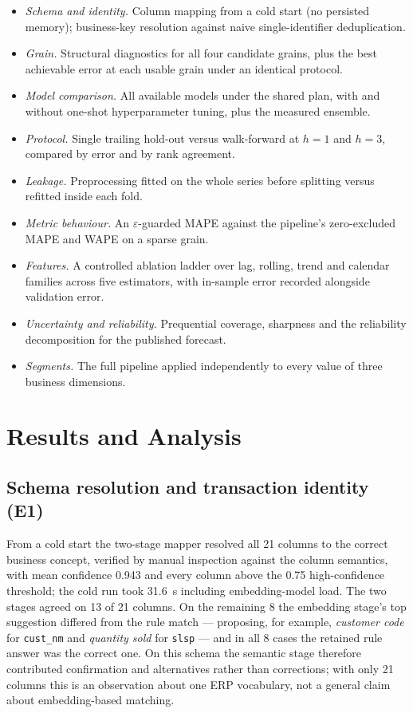\documentclass[conference]{IEEEtran}
\begin{document}
\begin{itemize}
\item[E1] \emph{Schema and identity.} Column mapping from a cold start (no
      persisted memory); business-key resolution against naive
      single-identifier deduplication.
\item[E2] \emph{Grain.} Structural diagnostics for all four candidate grains,
      plus the best achievable error at each usable grain under an identical
      protocol.
\item[E3] \emph{Model comparison.} All available models under the shared plan,
      with and without one-shot hyperparameter tuning, plus the measured
      ensemble.
\item[E4] \emph{Protocol.} Single trailing hold-out versus walk-forward at
      $h=1$ and $h=3$, compared by error and by rank agreement.
\item[E5] \emph{Leakage.} Preprocessing fitted on the whole series before
      splitting versus refitted inside each fold.
\item[E6] \emph{Metric behaviour.} An $\varepsilon$-guarded MAPE against the
      pipeline's zero-excluded MAPE and WAPE on a sparse grain.
\item[E7] \emph{Features.} A controlled ablation ladder over lag, rolling,
      trend and calendar families across five estimators, with in-sample error
      recorded alongside validation error.
\item[E8] \emph{Uncertainty and reliability.} Prequential coverage, sharpness
      and the reliability decomposition for the published forecast.
\item[E9] \emph{Segments.} The full pipeline applied independently to every
      value of three business dimensions.
\end{itemize}

\section{Results and Analysis}
\label{sec:results}

\subsection{Schema resolution and transaction identity (E1)}

From a cold start the two-stage mapper resolved all 21 columns to the correct
business concept, verified by manual inspection against the column semantics,
with mean confidence 0.943 and every column above the 0.75 high-confidence
threshold; the cold run took 31.6~s including embedding-model load. The two
stages agreed on 13 of 21 columns. On the remaining 8 the embedding stage's
top suggestion differed from the rule match --- proposing, for example,
\emph{customer code} for \texttt{cust\_nm} and \emph{quantity sold} for
\texttt{slsp} --- and in all 8 cases the retained rule answer was the correct
one. On this schema the semantic stage therefore contributed confirmation and
alternatives rather than corrections; with only 21 columns this is an
observation about one ERP vocabulary, not a general claim about embedding-based
matching.
\end{document}

